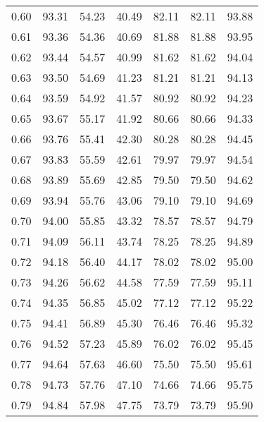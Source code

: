 \begin{tabular}{|c|c|c|c|c|c|c|}
      0.60 &     93.31 &     54.23 &      40.49 &   82.11 &      82.11 &         93.88 \\
      0.61 &     93.36 &     54.36 &      40.69 &   81.88 &      81.88 &         93.95 \\
      0.62 &     93.44 &     54.57 &      40.99 &   81.62 &      81.62 &         94.04 \\
      0.63 &     93.50 &     54.69 &      41.23 &   81.21 &      81.21 &         94.13 \\
      0.64 &     93.59 &     54.92 &      41.57 &   80.92 &      80.92 &         94.23 \\
      0.65 &     93.67 &     55.17 &      41.92 &   80.66 &      80.66 &         94.33 \\
      0.66 &     93.76 &     55.41 &      42.30 &   80.28 &      80.28 &         94.45 \\
      0.67 &     93.83 &     55.59 &      42.61 &   79.97 &      79.97 &         94.54 \\
      0.68 &     93.89 &     55.69 &      42.85 &   79.50 &      79.50 &         94.62 \\
      0.69 &     93.94 &     55.76 &      43.06 &   79.10 &      79.10 &         94.69 \\
      0.70 &     94.00 &     55.85 &      43.32 &   78.57 &      78.57 &         94.79 \\
      0.71 &     94.09 &     56.11 &      43.74 &   78.25 &      78.25 &         94.89 \\
      0.72 &     94.18 &     56.40 &      44.17 &   78.02 &      78.02 &         95.00 \\
      0.73 &     94.26 &     56.62 &      44.58 &   77.59 &      77.59 &         95.11 \\
      0.74 &     94.35 &     56.85 &      45.02 &   77.12 &      77.12 &         95.22 \\
      0.75 &     94.41 &     56.89 &      45.30 &   76.46 &      76.46 &         95.32 \\
      0.76 &     94.52 &     57.23 &      45.89 &   76.02 &      76.02 &         95.45 \\
      0.77 &     94.64 &     57.63 &      46.60 &   75.50 &      75.50 &         95.61 \\
      0.78 &     94.73 &     57.76 &      47.10 &   74.66 &      74.66 &         95.75 \\
      0.79 &     94.84 &     57.98 &      47.75 &   73.79 &      73.79 &         95.90 \\

\end{tabular}
